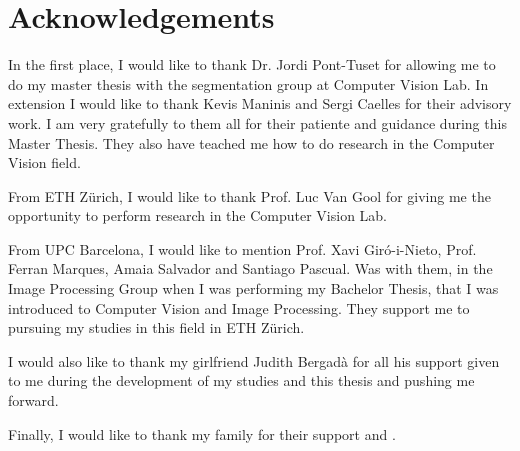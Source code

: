 
\chapter*{Acknowledgements}
\label{cha:ack}

In the first place, I would like to thank Dr. Jordi Pont-Tuset for allowing me to do my master thesis with the segmentation group at Computer Vision Lab. In extension I would like to thank Kevis Maninis and Sergi Caelles for their advisory work. I am very gratefully to them all for their patiente and guidance during this Master Thesis. They also have teached me how to do research in the Computer Vision field.

From ETH Z\"urich, I would like to thank Prof. Luc Van Gool for giving me the opportunity to perform research in the Computer Vision Lab.

From UPC Barcelona, I would like to mention Prof. Xavi Gir\'o-i-Nieto, Prof. Ferran Marques, Amaia Salvador and Santiago Pascual. Was with them, in the Image Processing Group when I was performing my Bachelor Thesis, that I was introduced to Computer Vision and Image Processing. They support me to pursuing my studies in this field in ETH Z\"urich.

I would also like to thank my girlfriend Judith Bergad\`a for all his support given to me during the development of my studies and this thesis and pushing me forward.

Finally, I would like to thank my family for their support and . 
